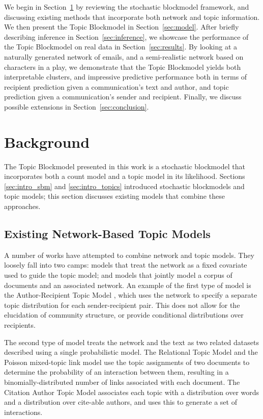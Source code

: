     We begin in Section~\ref{sec:background} by reviewing the stochastic blockmodel framework, and discussing existing methods that incorporate both network and topic information. We then present the Topic Blockmodel in Section~\ref{sec:model}. After briefly describing inference in Section~\ref{sec:inference}, we showcase the performance
    of the Topic Blockmodel on real data in Section~\ref{sec:results}. By looking at a naturally generated network of emails, and a semi-realistic network based on characters in a play, we demonstrate that the Topic Blockmodel yields both interpretable clusters, and impressive predictive performance  both in terms of recipient prediction given a communication's text and author, and topic prediction given a communication's sender and recipient. Finally, we discuss possible extensions in Section~\ref{sec:conclusion}.

\section{Background}\label{sec:background}

    The Topic Blockmodel presented in this work is a stochastic blockmodel that incorporates both a count model and a topic model in its likelihood. Sections \ref{sec:intro_sbm} and \ref{sec:intro_topics} introduced stochastic blockmodels and topic models; this section discusses existing models that combine these approaches.

    \subsection{Existing Network-Based Topic Models}\label{sec:related}
    
        A number of works have attempted to combine network and topic models. 
        They loosely fall into two camps: models that treat the network as a fixed covariate used to guide the topic model; and models that jointly model a corpus of documents and an associated network. An example of the first type of model is the Author-Recipient Topic Model \citep{mccallum2005}, which uses the network to specify a separate  topic distribution for each sender-recipient pair. This does not allow for the elucidation of community structure, or provide conditional distributions over recipients.
        
        The second type of model treats the network and the text as two related datasets described using a single probabilistic model.
        The Relational Topic Model \citep{rtm} and the Poisson mixed-topic link model \citep{Zhu:Yan:Getoor:Moore:2013} use the topic assignments of two documents to determine the probability of an interaction between them, resulting in a binomially-distributed number of links associated with each document. The Citation Author Topic Model \citep{tu2010} associates each topic with a distribution over words and a distribution over cite-able authors, and uses this to generate a set of interactions.
        
